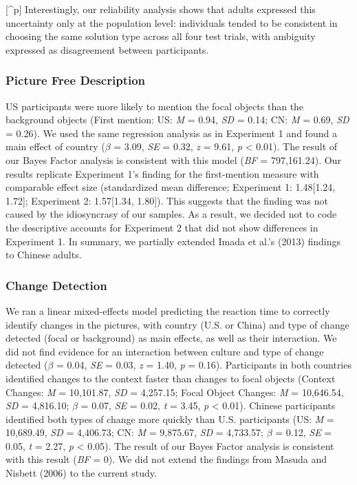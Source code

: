 \documentclass[
  man]{apa6}
\begin{document}
{[}\^{}p{]} Interestingly, our reliability analysis shows that adults expressed this uncertainty only at the population level: individuals tended to be consistent in choosing the same solution type across all four test trials, with ambiguity expressed as disagreement between participants.

\hypertarget{picture-free-description-1}{%
\subsubsection{Picture Free Description}\label{picture-free-description-1}}

US participants were more likely to mention the focal objects than the background objects (First mention: US: \emph{M} = 0.94, \emph{SD} = 0.14; CN: \emph{M} = 0.69, \emph{SD} = 0.26). We used the same regression analysis as in Experiment 1 and found a main effect of country (\(\beta\) = 3.09, \emph{SE} = 0.32, \emph{z} = 9.61, \emph{p} \textless{} 0.01). The result of our Bayes Factor analysis is consistent with this model (\emph{BF} = 797,161.24). Our results replicate Experiment 1's finding for the first-mention measure with comparable effect size (standardized mean difference; Experiment 1: 1.48{[}1.24, 1.72{]}; Experiment 2: 1.57{[}1.34, 1.80{]}). This suggests that the finding was not caused by the idiosyncrasy of our samples. As a result, we decided not to code the descriptive accounts for Experiment 2 that did not show differences in Experiment 1. In summary, we partially extended Imada et al.'s (2013) findings to Chinese adults.

\hypertarget{change-detection-1}{%
\subsubsection{Change Detection}\label{change-detection-1}}

We ran a linear mixed-effects model predicting the reaction time to correctly identify changes in the pictures, with country (U.S. or China) and type of change detected (focal or background) as main effects, as well as their interaction. We did not find evidence for an interaction between culture and type of change detected (\(\beta\) = 0.04, \emph{SE} = 0.03, \emph{z} = 1.40, \emph{p} = 0.16). Participants in both countries identified changes to the context faster than changes to focal objects (Context Changes: \emph{M} = 10,101.87, \emph{SD} = 4,257.15; Focal Object Changes: \emph{M} = 10,646.54, \emph{SD} = 4,816.10; \(\beta\) = 0.07, \emph{SE} = 0.02, \emph{t} = 3.45, \emph{p} \textless{} 0.01). Chinese participants identified both types of change more quickly than U.S. participants (US: \emph{M} = 10,689.49, \emph{SD} = 4,406.73; CN: \emph{M} = 9,875.67, \emph{SD} = 4,733.57; \(\beta\) = 0.12, \emph{SE} = 0.05, \emph{t} = 2.27, \emph{p} \textless{} 0.05). The result of our Bayes Factor analysis is consistent with this result (\emph{BF} = 0). We did not extend the findings from Masuda and Nisbett (2006) to the current study.
\end{document}
